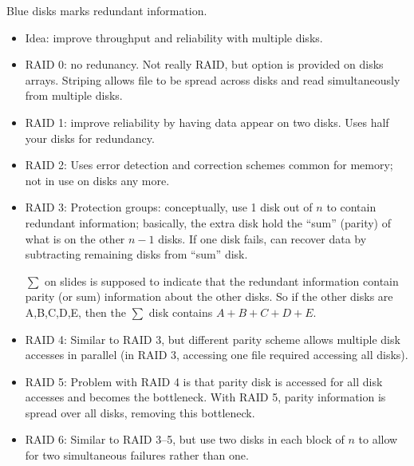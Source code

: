 \newpage
\begin{frame}[fragile]
\begin{center}
\end{center}

Blue disks marks redundant information.

\BNotes\ifnum{}
\begin{itemize}
	\item Idea: improve throughput and reliability with multiple disks.
	\item RAID 0: no redunancy.  Not really RAID, but option is
		provided on disks arrays.  Striping allows file to be
		spread across disks and read simultaneously from
		multiple disks.
	\item RAID 1: improve reliability by having data appear on two disks.			Uses half your disks for redundancy.
	\item RAID 2: Uses error detection and correction schemes common
		for memory; not in use on disks any more.
	\item RAID 3: Protection groups: conceptually, use 1 disk out of $n$
		to contain redundant information; basically, the extra disk
		hold the ``sum'' (parity) of what is on the other $n-1$ disks.  
		If one disk fails, can recover data by subtracting remaining
		disks from ``sum'' disk.

		$\sum$ on slides is supposed to indicate that the redundant
		information contain parity (or sum) information about
		the other disks.  So if the other disks are A,B,C,D,E,
		then the $\sum$ disk contains $A+B+C+D+E$.
	\item RAID 4: Similar to RAID 3, but different parity scheme allows
		multiple disk accesses in parallel (in RAID 3, accessing one
		file required accessing all disks).
	\item RAID 5: Problem with RAID 4 is that parity disk is accessed
		for all disk accesses and becomes the bottleneck.  With
		RAID 5, parity information is spread over all disks, removing
		this bottleneck.
	\item RAID 6: Similar to RAID 3--5, but use two disks in each block
		of $n$ to allow for two simultaneous failures rather than one.
\end{itemize}
\fi\ENotes
\end{frame}


